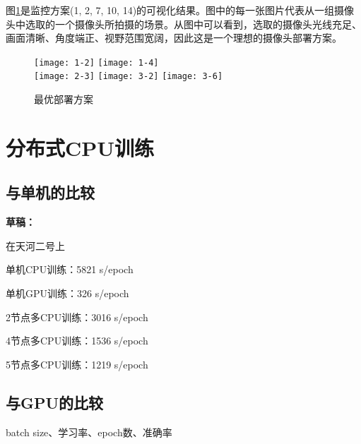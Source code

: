 图\ref{fig:rlresult}是监控方案(1, 2, 7, 10, 14)的可视化结果。图中的每一张图片代表从一组摄像头中选取的一个摄像头所拍摄的场景。从图中可以看到，选取的摄像头光线充足、画面清晰、角度端正、视野范围宽阔，因此这是一个理想的摄像头部署方案。

\begin{figure}[!ht]
    \centering
    \texttt{[image: 1-2]}
    \texttt{[image: 1-4]}\\
    \texttt{[image: 2-3]}
    \texttt{[image: 3-2]}
    \texttt{[image: 3-6]}
    \caption{最优部署方案}
    \label{fig:rlresult}
\end{figure}

\section{分布式CPU训练}

\subsection{与单机的比较}

\textbf{草稿：}

在天河二号上

单机CPU训练：5821 s/epoch

单机GPU训练：326 s/epoch

2节点多CPU训练：3016 s/epoch

4节点多CPU训练：1536 s/epoch

5节点多CPU训练：1219 s/epoch

\subsection{与GPU的比较}

batch size、学习率、epoch数、准确率